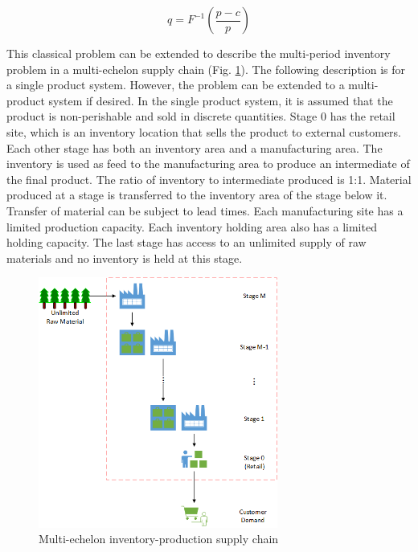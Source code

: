 \documentclass[12pt]{article}
\begin{document}
\begin{equation}
    q = F^{-1}\left(\frac{p-c}{p}\right)
\end{equation}

This classical problem can be extended to describe the multi-period inventory problem in a multi-echelon supply chain (Fig. \ref{fig:supplychain}). The following description is for a single product system. However, the problem can be extended to a multi-product system if desired. In the single product system, it is assumed that the product is non-perishable and sold in discrete quantities. Stage 0 has the retail site, which is an inventory location that sells the product to external customers. Each other stage has both an inventory area and a manufacturing area. The inventory is used as feed to the manufacturing area to produce an intermediate of the final product. The ratio of inventory to intermediate produced is 1:1. Material produced at a stage is transferred to the inventory area of the stage below it. Transfer of material can be subject to lead times. Each manufacturing site has a limited production capacity. Each inventory holding area also has a limited holding capacity. The last stage has access to an unlimited supply of raw materials and no inventory is held at this stage.

\begin{figure}[h]
    \centering
    \includegraphics[width=0.7\textwidth]{SupplyChain.png}
    \caption{Multi-echelon inventory-production supply chain}
    \label{fig:supplychain}
\end{figure}
\end{document}
